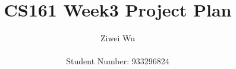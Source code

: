 \documentclass[11pt]{article}
\begin{document}


\title{CS161 Week3 Project Plan}%
\author{Ziwei Wu\\ %
\\
Student Number: 933296824} %

\maketitle

\end{document}
